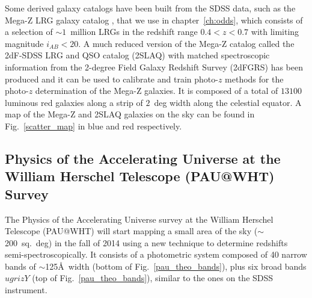 Some derived galaxy catalogs have been built from the SDSS data, such as the Mega-Z LRG galaxy catalog \citep{Collister2007}, that we use in chapter~\ref{ch:odds}, which consists of a selection of $\sim1$~million LRGs in the redshift range $0.4<z<0.7$ with limiting magnitude $i_{AB}<20$. A much reduced version of the Mega-Z catalog called the 2dF-SDSS LRG and QSO catalog (2SLAQ) \citep{Cannon2006} with matched spectroscopic information from the 2-degree Field Galaxy Redshift Survey (2dFGRS) has been produced and it can be used to calibrate and train photo-$z$ methods for the photo-$z$ determination of the Mega-Z galaxies. It is composed of a total of $13100$ luminous red galaxies along a strip of $2$~deg width along the celestial equator. A map of the Mega-Z and 2SLAQ galaxies on the sky can be found in Fig.~\ref{scatter_map} in blue and red respectively.

\subsection{Physics of the Accelerating Universe at the William Herschel Telescope (PAU@WHT) Survey}
\label{sec:pau}

The Physics of the Accelerating Universe survey at the William Herschel Telescope (PAU@WHT) will start mapping a small area of the sky ($\sim$200~sq.~deg) in the fall of 2014 using a new technique to determine redshifts semi-spectroscopically. It consists of a photometric system composed of 40 narrow bands of $\sim$125\AA \ width (bottom of Fig.~\ref{pau_theo_bands}), plus six broad bands $ugrizY$ (top of Fig.~\ref{pau_theo_bands}), similar to the ones on the SDSS instrument.


